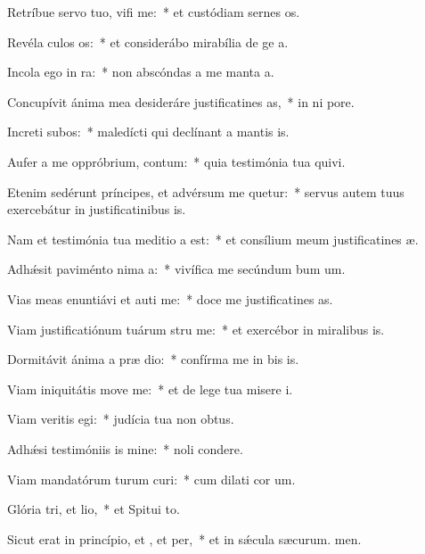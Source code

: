 \item Retríbue servo tuo, vifi me:~* et custódiam sernes os.
\item Revéla culos os:~* et considerábo mirabília de ge a.
\item Incola ego  in ra:~* non abscóndas a me manta a.
\item Concupívit ánima mea desideráre justificatines as,~* in ni pore.
\item Increti subos:~* maledícti qui declínant a mantis is.
\item Aufer a me oppróbrium,  contum:~* quia testimónia tua quivi.
\item Etenim sedérunt príncipes, et advérsum me quetur:~* servus autem tuus exercebátur in justificatinibus is.
\item Nam et testimónia tua meditio a est:~* et consílium meum justificatines æ.
\item Adhǽsit paviménto nima a:~* vivífica me secúndum bum um.
\item Vias meas enuntiávi et auti me:~* doce me justificatines as.
\item Viam justificatiónum tuárum stru me:~* et exercébor in miralibus is.
\item Dormitávit ánima a præ dio:~* confírma me in bis is.
\item Viam iniquitátis move  me:~* et de lege tua misere i.
\item Viam veritis egi:~* judícia tua non  obtus.
\item Adhǽsi testimóniis is mine:~* noli  condere.
\item Viam mandatórum turum curi:~* cum dilati cor um.
\item Glória tri, et lio,~* et Spitui to.
\item Sicut erat in princípio, et , et per,~* et in sǽcula sæcurum. men.
